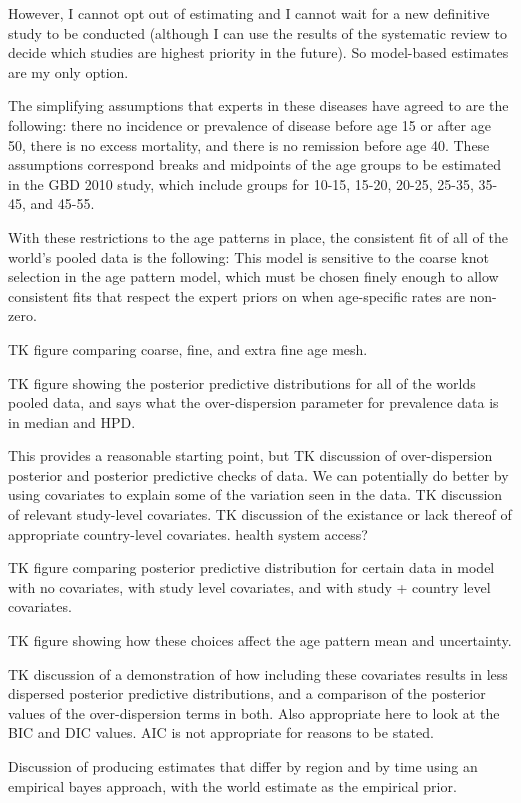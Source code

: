 However, I cannot opt out of estimating and I cannot wait for a new
definitive study to be conducted (although I can use the results of
the systematic review to decide which studies are highest priority in
the future).  So model-based estimates are my only option.

The simplifying assumptions that experts in these diseases have agreed
to are the following: there no incidence or prevalence of disease
before age 15 or after age 50, there is no excess mortality, and there
is no remission before age 40.  These assumptions correspond breaks
and midpoints of the age groups to be estimated in the GBD 2010 study,
which include groups for 10-15, 15-20, 20-25, 25-35, 35-45, and 45-55.

With these restrictions to the age patterns in place, the consistent
fit of all of the world's pooled data is the following:
This model is sensitive to the coarse knot selection in the age
pattern model, which must be chosen finely enough to allow consistent
fits that respect the expert priors on when age-specific rates are
non-zero.

TK figure comparing coarse, fine, and extra fine age mesh.

TK figure showing the posterior predictive distributions for all of
the worlds pooled data, and says what the over-dispersion parameter
for prevalence data is in median and HPD.

This provides a reasonable starting point, but TK discussion of
over-dispersion posterior and posterior predictive checks of data.  We
can potentially do better by using covariates to explain some of the
variation seen in the data.  TK discussion of relevant study-level
covariates.  TK discussion of the existance or lack thereof of
appropriate country-level covariates.  health system access?

TK figure comparing posterior predictive distribution for certain data
in model with no covariates, with study level covariates, and with
study + country level covariates.

TK figure showing how these choices affect the age pattern mean and
uncertainty.

TK discussion of a demonstration of how including these covariates
results in less dispersed posterior predictive distributions, and a
comparison of the posterior values of the over-dispersion terms in
both.  Also appropriate here to look at the BIC and DIC values.  AIC
is not appropriate for reasons to be stated.

Discussion of producing estimates that differ by region and  by time
using an empirical bayes approach, with the world estimate as the
empirical prior.

